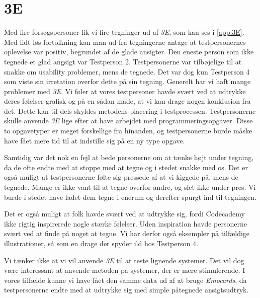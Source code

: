 \section{3E}\label{sec:eval3E}
Med fire forsøgspersoner fik vi fire tegninger ud af \textit{3E}, som kan ses i \cref{app:3E}. Med lidt løs fortolkning kan man ud fra tegningerne antage at testpersonernes oplevelse var positiv, begrundet af de glade ansigter. Den eneste person som ikke tegnede et glad angsigt var Testperson 2. Testpersonerne var tilbøjelige til at snakke om usability problemer, mens de tegnede. Det var dog kun Testperson 4 som viste sin irretation overfor dette på sin tegning. 
Generelt har vi haft mange problemer med \textit{3E}. Vi føler at vores testpersoner havde svært ved at udtrykke deres følelser grafisk og på en sådan måde, at vi kan drage nogen konklusion fra det. Dette kan til dels skyldes metodens placering i testprocessen. Testpersonerne skulle anvende \textit{3E} lige efter at have arbejdet med programmeringsopgaver. Disse to opgavetyper er meget forskellige fra hinanden, og testpersonerne burde måske have fået mere tid til at indstille sig på en ny type opgave.   

Samtidig var det nok en fejl at bede personerne om at tænke højt under tegning, da de ofte endte med at stoppe med at tegne og i stedet snakke med os. Det er også muligt at testpersonerne følte sig pressede af at vi kiggede på, mens de tegnede. Mange er ikke vant til at tegne overfor andre, og slet ikke under pres. Vi burde i stedet have ladet dem tegne i enerum og derefter spurgt ind til tegningen. 

Det er også muligt at folk havde svært ved at udtrykke sig, fordi Codecademy ikke rigtig inspirerede nogle stærke følelser. Uden inspiration havde personerne svært ved at finde på noget at tegne. Vi har derfor også eksempler på tilfældige illustrationer, så som en drage der spyder ild hos Testperson 4. 

Vi tænker ikke at vi vil anvende \textit{3E} til at teste lignende systemer. Det vil dog være interessant at anvende metoden på systemer, der er mere stimulerende. I vores tilfælde kunne vi have fået den samme data ud af at bruge \textit{Emocards}, da testpersonerne endte med at udtrykke sig med simple påtegnede ansigtsudtryk.



